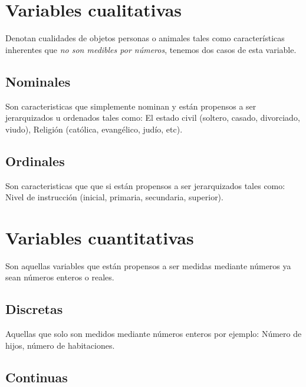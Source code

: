\documentclass[10pt,]{krantz}
\theoremstyle{definition}
\theoremstyle{definition}
\theoremstyle{definition}
\theoremstyle{definition}
\theoremstyle{remark}
\begin{document}
\hypertarget{variables-cualitativas}{%
\section{Variables cualitativas}\label{variables-cualitativas}}

Denotan cualidades de objetos personas o animales tales como características inherentes que \emph{no son medibles por números}, tenemos dos casos de esta variable.

\hypertarget{nominales}{%
\subsection{Nominales}\label{nominales}}

Son caracteristicas que simplemente nominan y están propensos a ser jerarquizados u ordenados tales como: El estado civil (soltero, casado, divorciado, viudo), Religión (católica, evangélico, judío, etc).

\hypertarget{ordinales}{%
\subsection{Ordinales}\label{ordinales}}

Son caracteristicas que que si están propensos a ser jerarquizados tales como: Nivel de instrucción (inicial, primaria, secundaria, superior).

\hypertarget{variables-cuantitativas}{%
\section{Variables cuantitativas}\label{variables-cuantitativas}}

Son aquellas variables que están propensos a ser medidas mediante números ya sean números enteros o reales.

\hypertarget{discretas}{%
\subsection{Discretas}\label{discretas}}

Aquellas que solo son medidos mediante números enteros por ejemplo: Número de hijos, número de habitaciones.

\hypertarget{continuas}{%
\subsection{Continuas}\label{continuas}}
\end{document}
